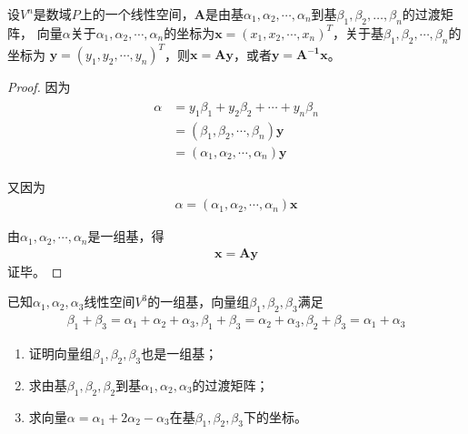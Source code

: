 \begin{theorem}
    设$V^{n}$是数域$P$上的一个线性空间，$\mathbf{A}$是由基$\alpha_{1},\alpha_{2},\cdots,\alpha_{n}$到基$\beta_{1},\beta_{2},\dots,\beta_{n}$的过渡矩阵，
    向量$\alpha$关于$\alpha_{1},\alpha_{2},\cdots,\alpha_{n}$的坐标为$\mathbf{x}=\left(x_{1},x_{2},\cdots,x_{n}\right)^{T}$，关于基$\beta_{1},\beta_{2},\cdots,\beta_{n}$的坐标为
    $\mathbf{y}=\left(y_{1},y_{2},\cdots,y_{n}\right)^{T}$，则$\mathbf{x=Ay}$，或者$\mathbf{y=A^{-1}x}$。
\end{theorem}

\begin{proof}
    因为
    \begin{eqnarray}
        \begin{aligned}
            \alpha&=y_{1}\beta_{1}+y_{2}\beta_{2}+\cdots+y_{n}\beta_{n}\\
            &=\left(\beta_{1},\beta_{2},\cdots,\beta_{n}\right)\mathbf{y}\\
            &=\left(\alpha_{1},\alpha_{2},\cdots,\alpha_{n}\right)\mathbf{y}
        \end{aligned}\nonumber
    \end{eqnarray}
    
    又因为
    \begin{eqnarray}
        \alpha=\left(\alpha_{1},\alpha_{2},\cdots,\alpha_{n}\right)\mathbf{x}\nonumber
    \end{eqnarray}

    由$\alpha_{1},\alpha_{2},\cdots,\alpha_{n}$是一组基，得
    \begin{eqnarray}
        \mathbf{x=Ay}\nonumber
    \end{eqnarray}
    证毕。
\end{proof}

\begin{example}
    已知$\alpha_{1},\alpha_{2},\alpha_{3}$线性空间$V^{3}$的一组基，向量组$\beta_{1},\beta_{2},\beta_{3}$满足
    \begin{eqnarray}
        \beta_{1}+\beta_{3}=\alpha_{1}+\alpha_{2}+\alpha_{3},\beta_{1}+\beta_{3}=\alpha_{2}+\alpha_{3},\beta_{2}+\beta_{3}=\alpha_{1}+\alpha_{3}\nonumber
    \end{eqnarray}

    \begin{enumerate}[label=(\arabic*)]
        \item 证明向量组$\beta_{1},\beta_{2},\beta_{3}$也是一组基；
        \item 求由基$\beta_{1},\beta_{2},\beta_{2}$到基$\alpha_{1},\alpha_{2},\alpha_{3}$的过渡矩阵；
        \item 求向量$\alpha=\alpha_{1}+2\alpha_{2}-\alpha_{3}$在基$\beta_{1},\beta_{2},\beta_{3}$下的坐标。
    \end{enumerate}
\end{example}

